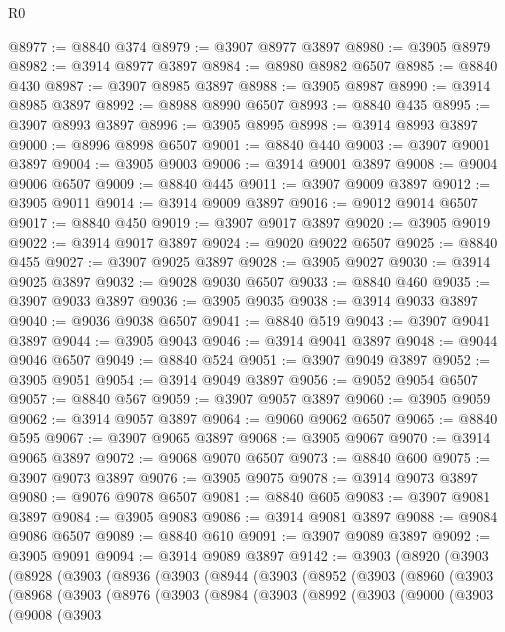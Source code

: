 \begin{lexlean}{R0}
\begin{coremodule}
@8977 := @8840 @374
@8979 := @3907 @8977 @3897
@8980 := @3905 @8979
@8982 := @3914 @8977 @3897
@8984 := @8980 @8982 @6507
@8985 := @8840 @430
@8987 := @3907 @8985 @3897
@8988 := @3905 @8987
@8990 := @3914 @8985 @3897
@8992 := @8988 @8990 @6507
@8993 := @8840 @435
@8995 := @3907 @8993 @3897
@8996 := @3905 @8995
@8998 := @3914 @8993 @3897
@9000 := @8996 @8998 @6507
@9001 := @8840 @440
@9003 := @3907 @9001 @3897
@9004 := @3905 @9003
@9006 := @3914 @9001 @3897
@9008 := @9004 @9006 @6507
@9009 := @8840 @445
@9011 := @3907 @9009 @3897
@9012 := @3905 @9011
@9014 := @3914 @9009 @3897
@9016 := @9012 @9014 @6507
@9017 := @8840 @450
@9019 := @3907 @9017 @3897
@9020 := @3905 @9019
@9022 := @3914 @9017 @3897
@9024 := @9020 @9022 @6507
@9025 := @8840 @455
@9027 := @3907 @9025 @3897
@9028 := @3905 @9027
@9030 := @3914 @9025 @3897
@9032 := @9028 @9030 @6507
@9033 := @8840 @460
@9035 := @3907 @9033 @3897
@9036 := @3905 @9035
@9038 := @3914 @9033 @3897
@9040 := @9036 @9038 @6507
@9041 := @8840 @519
@9043 := @3907 @9041 @3897
@9044 := @3905 @9043
@9046 := @3914 @9041 @3897
@9048 := @9044 @9046 @6507
@9049 := @8840 @524
@9051 := @3907 @9049 @3897
@9052 := @3905 @9051
@9054 := @3914 @9049 @3897
@9056 := @9052 @9054 @6507
@9057 := @8840 @567
@9059 := @3907 @9057 @3897
@9060 := @3905 @9059
@9062 := @3914 @9057 @3897
@9064 := @9060 @9062 @6507
@9065 := @8840 @595
@9067 := @3907 @9065 @3897
@9068 := @3905 @9067
@9070 := @3914 @9065 @3897
@9072 := @9068 @9070 @6507
@9073 := @8840 @600
@9075 := @3907 @9073 @3897
@9076 := @3905 @9075
@9078 := @3914 @9073 @3897
@9080 := @9076 @9078 @6507
@9081 := @8840 @605
@9083 := @3907 @9081 @3897
@9084 := @3905 @9083
@9086 := @3914 @9081 @3897
@9088 := @9084 @9086 @6507
@9089 := @8840 @610
@9091 := @3907 @9089 @3897
@9092 := @3905 @9091
@9094 := @3914 @9089 @3897
@9142 := @3903
    (@8920
      (@3903
        (@8928
          (@3903
            (@8936
              (@3903
                (@8944
                  (@3903
                    (@8952
                      (@3903
                        (@8960
                          (@3903
                            (@8968
                              (@3903
                                (@8976
                                  (@3903
                                    (@8984
                                      (@3903
                                        (@8992
                                          (@3903
                                            (@9000
                                              (@3903
                                                (@9008
                                                  (@3903

\end{coremodule}
\end{lexlean}
